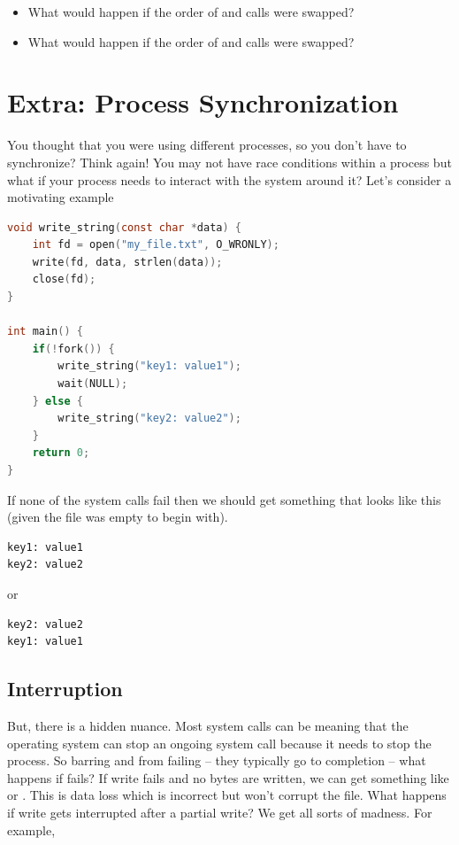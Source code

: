 \begin{itemize}
\tightlist
\item
  What would happen if the order of  and  calls were swapped?
\item
  What would happen if the order of  and  calls were swapped?
\end{itemize}


\section{Extra: Process Synchronization}\label{process-synchronization}

You thought that you were using different processes, so you don't have to synchronize? Think again! You may not have race conditions within a process but what if your process needs to interact with the system around it? Let's consider a motivating example

\begin{lstlisting}[language=C]
void write_string(const char *data) {
    int fd = open("my_file.txt", O_WRONLY);
    write(fd, data, strlen(data));
    close(fd);
}

int main() {
    if(!fork()) {
        write_string("key1: value1");
        wait(NULL);
    } else {
        write_string("key2: value2");
    }
    return 0;
}
\end{lstlisting}

If none of the system calls fail then we should get something that looks like this (given the file was empty to begin with).

\begin{lstlisting}
key1: value1
key2: value2
\end{lstlisting}

or

\begin{lstlisting}
key2: value2
key1: value1
\end{lstlisting}

\subsection{Interruption}\label{interruption}

But, there is a hidden nuance. Most system calls can be  meaning that the operating system can stop an ongoing system call because it needs to stop the process. So barring    and  from failing -- they typically go to completion -- what happens if  fails? If write fails and no bytes are written, we can get something like  or . This is data loss which is incorrect but won't corrupt the file. What happens if write gets interrupted after a partial write? We get all sorts of madness. For example,

